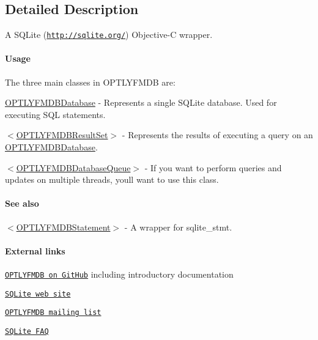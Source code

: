 \subsection{Detailed Description}
A S\+Q\+Lite (\href{http://sqlite.org/}{\tt http\+://sqlite.\+org/}) Objective-\/C wrapper.

\paragraph*{Usage}

The three main classes in O\+P\+T\+L\+Y\+F\+M\+DB are\+:


\begin{DoxyItemize}
\item {\ttfamily \mbox{\hyperlink{interface_o_p_t_l_y_f_m_d_b_database}{O\+P\+T\+L\+Y\+F\+M\+D\+B\+Database}}} -\/ Represents a single S\+Q\+Lite database. Used for executing S\+QL statements.
\item {\ttfamily $<$\mbox{\hyperlink{interface_o_p_t_l_y_f_m_d_b_result_set}{O\+P\+T\+L\+Y\+F\+M\+D\+B\+Result\+Set}}$>$} -\/ Represents the results of executing a query on an {\ttfamily \mbox{\hyperlink{interface_o_p_t_l_y_f_m_d_b_database}{O\+P\+T\+L\+Y\+F\+M\+D\+B\+Database}}}.
\item {\ttfamily $<$\mbox{\hyperlink{interface_o_p_t_l_y_f_m_d_b_database_queue}{O\+P\+T\+L\+Y\+F\+M\+D\+B\+Database\+Queue}}$>$} -\/ If you want to perform queries and updates on multiple threads, you\textquotesingle{}ll want to use this class.
\end{DoxyItemize}

\paragraph*{See also}


\begin{DoxyItemize}
\item {\ttfamily $<$\mbox{\hyperlink{interface_o_p_t_l_y_f_m_d_b_statement}{O\+P\+T\+L\+Y\+F\+M\+D\+B\+Statement}}$>$} -\/ A wrapper for {\ttfamily sqlite\+\_\+stmt}.
\end{DoxyItemize}

\paragraph*{External links}


\begin{DoxyItemize}
\item \href{https://github.com/ccgus/optlyfmdb}{\tt O\+P\+T\+L\+Y\+F\+M\+DB on Git\+Hub} including introductory documentation
\item \href{http://sqlite.org/}{\tt S\+Q\+Lite web site}
\item \href{http://groups.google.com/group/optlyfmdb}{\tt O\+P\+T\+L\+Y\+F\+M\+DB mailing list}
\item \href{http://www.sqlite.org/faq.html}{\tt S\+Q\+Lite F\+AQ}
\end{DoxyItemize}

